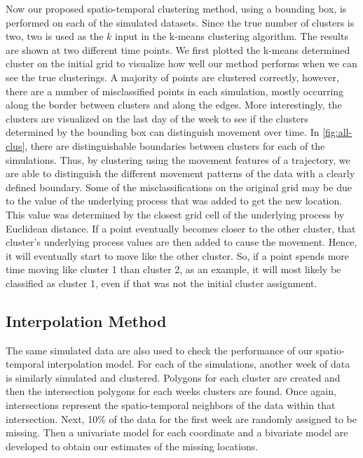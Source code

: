 \documentclass[12pt]{article}
\begin{document}
Now our proposed spatio-temporal clustering method, using a bounding
box, is performed on each of the simulated datasets. Since the true
number of clusters is two, two is used as the \(k\) input in the k-means
clustering algorithm. The results are shown at two different time
points. We first plotted the k-means determined cluster on the initial
grid to visualize how well our method performs when we can see the true
clusterings. A majority of points are clustered correctly, however,
there are a number of misclassified points in each simulation, mostly
occurring along the border between clusters and along the edges. More
interestingly, the clusters are visualized on the last day of the week
to see if the clusters determined by the bounding box can distinguish
movement over time. In \cref{fig:all-clus}, there are distinguishable
boundaries between clusters for each of the simulations. Thus, by
clustering using the movement features of a trajectory, we are able to
distinguish the different movement patterns of the data with a clearly
defined boundary. Some of the misclassifications on the original grid
may be due to the value of the underlying process that was added to get
the new location. This value was determined by the closest grid cell of
the underlying process by Euclidean distance. If a point eventually
becomes closer to the other cluster, that cluster's underlying process
values are then added to cause the movement. Hence, it will eventually
start to move like the other cluster. So, if a point spends more time
moving like cluster 1 than cluster 2, as an example, it will most likely
be classified as cluster 1, even if that was not the initial cluster
assignment.

\hypertarget{interpolation-method}{%
\subsection{Interpolation Method}\label{interpolation-method}}

The same simulated data are also used to check the performance of our
spatio-temporal interpolation model. For each of the simulations,
another week of data is similarly simulated and clustered. Polygons for
each cluster are created and then the intersection polygons for each
weeks clusters are found. Once again, intersections represent the
spatio-temporal neighbors of the data within that intersection. Next,
10\% of the data for the first week are randomly assigned to be missing.
Then a univariate model for each coordinate and a bivariate model are
developed to obtain our estimates of the missing locations.
\end{document}
